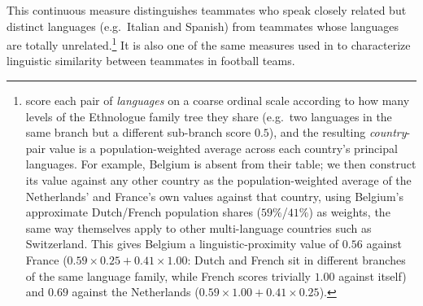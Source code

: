 \documentclass[10pt]{article}
\begin{document}
This continuous measure distinguishes teammates who speak closely related but distinct languages (e.g.\ Italian and Spanish) from teammates whose languages are totally unrelated.\footnote{\citet{melitztoubal2014} score each pair of \emph{languages} on a coarse ordinal scale according to how many levels of the Ethnologue family tree they share (e.g.\ two languages in the same branch but a different sub-branch score $0.5$), and the resulting \emph{country}-pair value is a population-weighted average across each country's principal languages. For example, Belgium is absent from their table; we then construct its value against any other country as the population-weighted average of the Netherlands' and France's own values against that country, using Belgium's approximate Dutch/French population shares ($59\%$/$41\%$) as weights, the same way \citet{melitztoubal2014} themselves apply to other multi-language countries such as Switzerland. This gives Belgium a linguistic-proximity value of $0.56$ against France ($0.59\times0.25+0.41\times1.00$: Dutch and French sit in different branches of the same language family, while French scores trivially $1.00$ against itself) and $0.69$ against the Netherlands ($0.59\times1.00+0.41\times0.25$).} It is also one of the same  measures used in \citet{bekesottaviano2025}  to characterize linguistic similarity between teammates in football teams.


\end{document}
